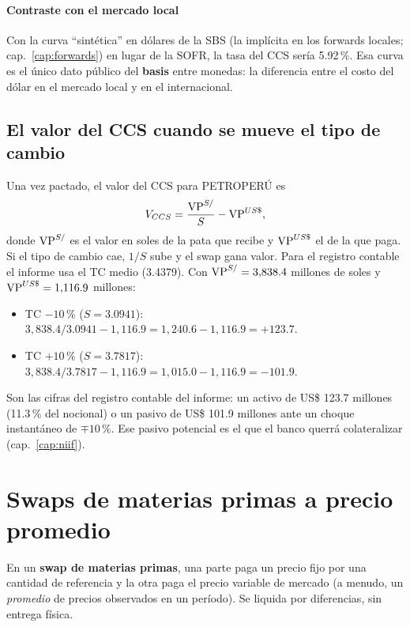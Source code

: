 \paragraph{Contraste con el mercado local} Con la curva \enquote{sintética} en dólares de la SBS (la implícita en los forwards locales; cap.~\ref{cap:forwards}) en lugar de la SOFR, la tasa del CCS sería 5.92\,\%. Esa curva es el único dato público del \textbf{basis} entre monedas: la diferencia entre el costo del dólar en el mercado local y en el internacional.

\subsection{El valor del CCS cuando se mueve el tipo de cambio}

Una vez pactado, el valor del CCS para PETROPERÚ es
\[ V_{CCS}=\frac{\operatorname{VP}^{S/}}{S}-\operatorname{VP}^{US\$}, \]
donde $\operatorname{VP}^{S/}$ es el valor en soles de la pata que recibe y $\operatorname{VP}^{US\$}$ el de la que paga. Si el tipo de cambio cae, $1/S$ sube y el swap gana valor. Para el registro contable el informe usa el TC medio (3.4379). Con $\operatorname{VP}^{S/}=3{,}838.4$ millones de soles y $\operatorname{VP}^{US\$}=1{,}116.9$ millones:
\begin{itemize}
\item TC $-10\,\%$ ($S=3.0941$): $3{,}838.4/3.0941-1{,}116.9=1{,}240.6-1{,}116.9=+123.7$.
\item TC $+10\,\%$ ($S=3.7817$): $3{,}838.4/3.7817-1{,}116.9=1{,}015.0-1{,}116.9=-101.9$.
\end{itemize}
Son las cifras del registro contable del informe: un activo de US\$ 123.7 millones (11.3\,\% del nocional) o un pasivo de US\$ 101.9 millones ante un choque instantáneo de $\mp10\,\%$. Ese pasivo potencial es el que el banco querrá colateralizar (cap.~\ref{cap:niif}).

\section{Swaps de materias primas a precio promedio}

\begin{definicion}
En un \textbf{swap de materias primas}, una parte paga un precio fijo por una cantidad de referencia y la otra paga el precio variable de mercado (a menudo, un \emph{promedio} de precios observados en un período). Se liquida por diferencias, sin entrega física.
\end{definicion}

